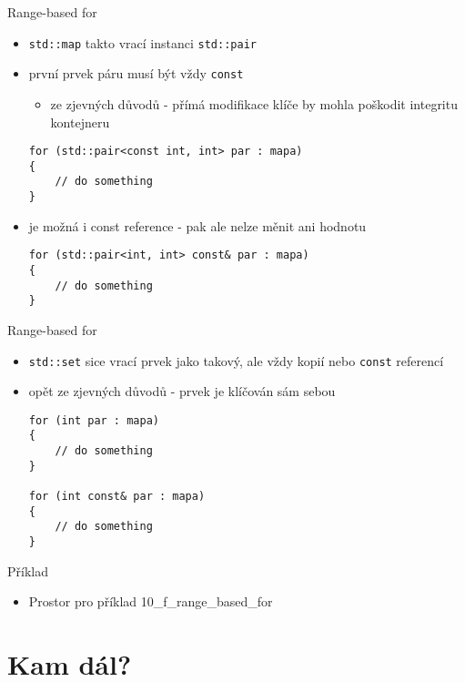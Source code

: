 \documentclass{beamer}
\begin{document}
\begin{xframe}{Range-based for}
	\begin{itemize}
		\item \texttt{std::map} takto vrací instanci \texttt{std::pair}
		\item první prvek páru musí být vždy \texttt{const}
			\begin{itemize}
				\item ze zjevných důvodů - přímá modifikace klíče by mohla poškodit integritu kontejneru
			\end{itemize}
\begin{lstlisting}[basicstyle=\fontsize{8}{9}\selectfont\ttfamily]
for (std::pair<const int, int> par : mapa)
{
    // do something
}
\end{lstlisting}
		\item je možná i const reference - pak ale nelze měnit ani hodnotu
\begin{lstlisting}[basicstyle=\fontsize{8}{9}\selectfont\ttfamily]
for (std::pair<int, int> const& par : mapa)
{
    // do something
}
\end{lstlisting}
	\end{itemize}
\end{xframe}

\begin{xframe}{Range-based for}
	\begin{itemize}
		\item \texttt{std::set} sice vrací prvek jako takový, ale vždy kopií nebo \texttt{const} referencí
		\item opět ze zjevných důvodů - prvek je klíčován sám sebou
\begin{lstlisting}[basicstyle=\fontsize{8}{9}\selectfont\ttfamily]
for (int par : mapa)
{
    // do something
}

for (int const& par : mapa)
{
    // do something
}
\end{lstlisting}
	\end{itemize}
\end{xframe}

\begin{xframe}{Příklad}
	\begin{itemize}
		\item Prostor pro příklad 10\_f\_range\_based\_for
	\end{itemize}
\end{xframe}

\section{Kam dál?}
\end{document}
